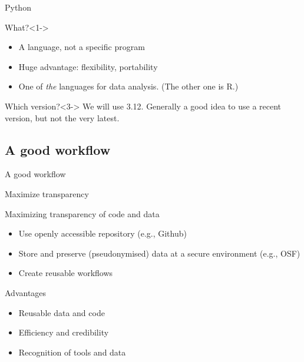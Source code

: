 \documentclass[compress]{beamer}
\begin{document}
\begin{frame}{Python}
\begin{block}{What?}<1->
\begin{itemize}
\item A language, not a specific program
\item Huge advantage: flexibility, portability
\item One of \emph{the} languages for data analysis. \tiny{(The other one is R.)}
\end{itemize}
\end{block}

\begin{block}{Which version?}<3->
We will use 3.12. Generally a good idea to use a recent version, but not the very latest. 
\end{block}
\end{frame}



\subsection{A good workflow}
\begin{frame}
	A good workflow
\end{frame}


\begin{frame}{Maximize transparency}
\begin{block}{Maximizing transparency of code and data}
	\begin{itemize}[<+->]
		\item Use openly accessible repository (e.g., Github)
		\item Store and preserve (pseudonymised) data at a secure environment (e.g., OSF)
		\item Create reusable workflows 
	\end{itemize}
\end{block}
\pause
\begin{exampleblock}{Advantages}
	\begin{itemize}[<+->]
		\item Reusable data and code
		\item Efficiency and credibility 
		\item Recognition of tools and data
	\end{itemize}
\end{exampleblock}

\end{frame}	
\end{document}
